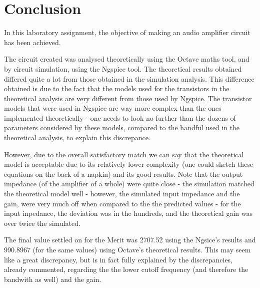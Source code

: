 \section{Conclusion}
\label{sec:conclusion}

In this laboratory assignment, the objective of making an audio amplifier circuit has been achieved.\par
The circuit created was analysed theoretically using the Octave maths tool, and by circuit simulation, using the
Ngspice tool. The theoretical results obtained differed quite a lot from those obtained in the simulation analysis. This difference obtained is due to the fact that the models used for the transistors in the theoretical analysis are very different from those used by Ngspice. The transistor models that were used in Ngspice are way more complex than the ones implemented theoretically - one needs to look no further than the dozens of parameters considered by these models, compared to the handful used in the theoretical analysis, to explain this discrepance. 

However, due to the overall satisfactory match we can say that the theoretical model is acceptable due to its relatively lower complexity (one could sketch these equations on the back of a napkin) and its good results. Note that the output impedance (of the amplifier of a whole) were quite close - the simulation matched the theoretical model well - however, the simulated input impedance and the gain, were very much off when compared to the the predicted values - for the input inpedance, the deviation was in the hundreds, and the theoretical gain was over twice the simulated.\par
The final value settled on for the Merit was 2707.52 using the Ngsice's results and 990.8967 (for the same values) using Octave's theoretical results. This may seem like a great discrepancy, but is in fact fully explained by the discrepancies, already commented, regarding the the lower cutoff frequency (and therefore the bandwith as well) and the gain.

